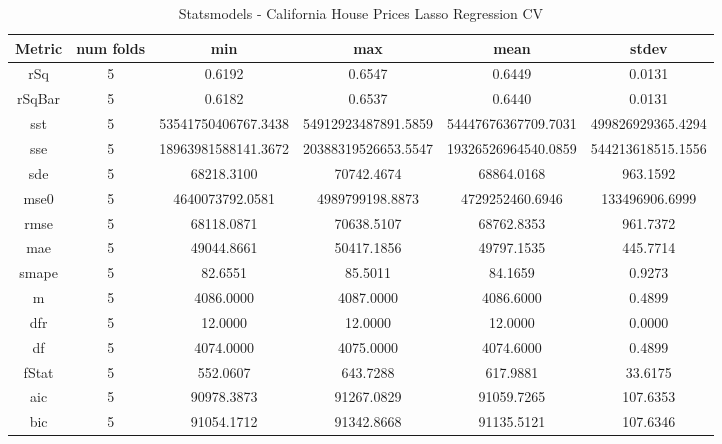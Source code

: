 \documentclass{article}
\begin{document}
\begin{table}[H]
\centering
\caption{Statsmodels - California House Prices Lasso Regression CV}
\label{tab:Statsmodels - House Prices Lasso Regression CV}
\begin{tabular}{|c|c|c|c|c|c|}\hline
Metric & num folds & min & max & mean & stdev \\ \hline \hline
rSq & 5 & 0.6192 & 0.6547 & 0.6449 & 0.0131 \\ \hline
rSqBar & 5 & 0.6182 & 0.6537 & 0.6440 & 0.0131 \\ \hline
sst & 5 & 53541750406767.3438 & 54912923487891.5859 & 54447676367709.7031 & 499826929365.4294 \\ \hline
sse & 5 & 18963981588141.3672 & 20388319526653.5547 & 19326526964540.0859 & 544213618515.1556 \\ \hline
sde & 5 & 68218.3100 & 70742.4674 & 68864.0168 & 963.1592 \\ \hline
mse0 & 5 & 4640073792.0581 & 4989799198.8873 & 4729252460.6946 & 133496906.6999 \\ \hline
rmse & 5 & 68118.0871 & 70638.5107 & 68762.8353 & 961.7372 \\ \hline
mae & 5 & 49044.8661 & 50417.1856 & 49797.1535 & 445.7714 \\ \hline
smape & 5 & 82.6551 & 85.5011 & 84.1659 & 0.9273 \\ \hline
m & 5 & 4086.0000 & 4087.0000 & 4086.6000 & 0.4899 \\ \hline
dfr & 5 & 12.0000 & 12.0000 & 12.0000 & 0.0000 \\ \hline
df & 5 & 4074.0000 & 4075.0000 & 4074.6000 & 0.4899 \\ \hline
fStat & 5 & 552.0607 & 643.7288 & 617.9881 & 33.6175 \\ \hline
aic & 5 & 90978.3873 & 91267.0829 & 91059.7265 & 107.6353 \\ \hline
bic & 5 & 91054.1712 & 91342.8668 & 91135.5121 & 107.6346 \\ \hline
\end{tabular}
\end{table}
\end{document}
